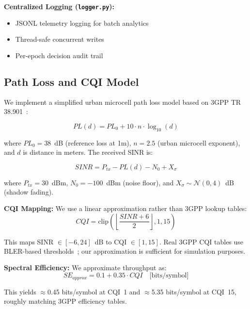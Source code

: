 \documentclass[journal]{IEEEtran}
\begin{document}
\textbf{Centralized Logging (\texttt{logger.py}):}
\begin{itemize}
    \item JSONL telemetry logging for batch analytics
    \item Thread-safe concurrent writes
    \item Per-epoch decision audit trail
\end{itemize}

\subsection{Path Loss and CQI Model}
\label{sec:pathloss}

We implement a simplified urban microcell path loss model based on 3GPP TR 38.901~\cite{3gpp2018nr}:

\begin{equation}
PL(d) = PL_0 + 10 \cdot n \cdot \log_{10}(d)
\label{eq:pathloss}
\end{equation}

where $PL_0 = 38$~dB (reference loss at 1m), $n = 2.5$ (urban microcell exponent), and $d$ is distance in meters. The received SINR is:

\begin{equation}
SINR = P_{tx} - PL(d) - N_0 + X_\sigma
\end{equation}

where $P_{tx} = 30$~dBm, $N_0 = -100$~dBm (noise floor), and $X_\sigma \sim \mathcal{N}(0, 4)$~dB (shadow fading).

\textbf{CQI Mapping:} We use a linear approximation rather than 3GPP lookup tables:
\begin{equation}
CQI = \text{clip}\left(\left\lfloor\frac{SINR + 6}{2}\right\rfloor, 1, 15\right)
\label{eq:cqi}
\end{equation}

This maps SINR $\in [-6, 24]$~dB to CQI $\in [1, 15]$. Real 3GPP CQI tables use BLER-based thresholds~\cite{3gpp2018nr}; our approximation is sufficient for simulation purposes.

\textbf{Spectral Efficiency:} We approximate throughput as:
\begin{equation}
SE_{approx} = 0.1 + 0.35 \cdot CQI \quad \text{[bits/symbol]}
\end{equation}

This yields $\approx$0.45 bits/symbol at CQI~1 and $\approx$5.35 bits/symbol at CQI~15, roughly matching 3GPP efficiency tables.

\end{document}
